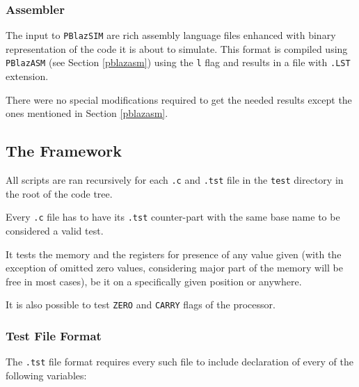             \subsubsection{Assembler}

                The input to \texttt{PBlazSIM} are rich assembly language files enhanced with binary representation of the code it is about to simulate. This format is compiled using \texttt{PBlazASM} (see Section \ref{pblazasm}) using the \texttt{\-l} flag and results in a file with \texttt{.LST} extension.

                There were no special modifications required to get the needed results except the ones mentioned in Section \ref{pblazasm}.

        \subsection{The Framework}

        All scripts are ran recursively for each \texttt{.c} and \texttt{.tst} file in the \texttt{test} directory in the root of the code tree.

        Every \texttt{.c} file has to have its \texttt{.tst} counter-part with the same base name to be considered a valid test.

        It tests the memory and the registers for presence of any value given (with the exception of omitted zero values, considering major part of the memory will be free in most cases), be it on a specifically given position or anywhere.

        It is also possible to test \texttt{ZERO} and \texttt{CARRY} flags of the processor.

            \subsubsection{Test File Format}

            The \texttt{.tst} file format requires every such file to include declaration of every of the following variables:

